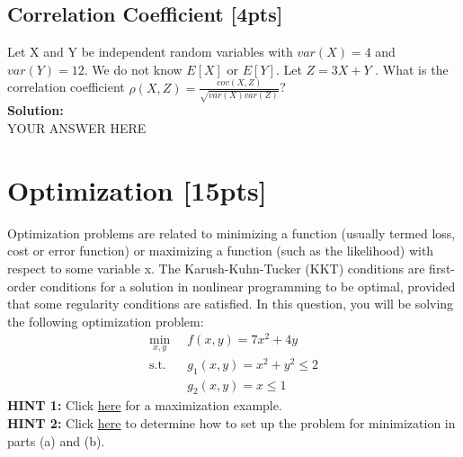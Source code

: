 \documentclass{article}
\begin{document}
\subsection{Correlation Coefficient [4pts]}
Let X and Y be independent random variables with $var(X) = 4$ and $var(Y ) = 12$. We do
not know $E[X]$ or $E[Y]$. Let $Z = 3X + Y$ . What is the correlation coefficient $\rho(X,Z)=\frac{cov(X,Z)}{\sqrt{var(X)var(Z)}}$?\bigskip \\
\textbf{Solution:}\\
YOUR ANSWER HERE
\newpage



\section{Optimization [15pts]}
Optimization problems are related to minimizing a function (usually termed loss, cost or error function) or maximizing a function (such as the likelihood) with respect to some variable x. The Karush-Kuhn-Tucker (KKT) conditions are first-order conditions for a solution in nonlinear programming to be optimal, provided that some regularity conditions are satisfied. In this question, you will be solving the following optimization problem:
\begin{align*}
    \min_{x,y} \;\;& f(x,y) = 7x^{2} + 4y \\
    \text{s.t.} \;\;& g_{1}(x,y) = x^{2}+y^{2}\leq 2 \\
    & g_{2}(x,y) = x \leq 1
\end{align*}
\textbf{HINT 1:} Click \href{https://www.youtube.com/watch?v=TqN-8fxYUYY}{here} for a maximization example. \\
\textbf{HINT 2:} Click \href{https://en.wikipedia.org/wiki/Karush-Kuhn-Tucker_conditions#Nonlinear_optimization_problem}{here} to determine how to set up the problem for minimization in parts (a) and (b).\\
\end{document}

